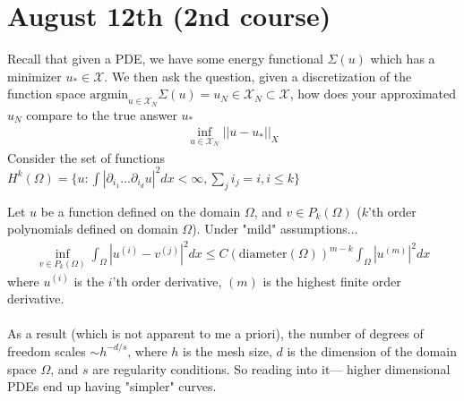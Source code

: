 \section{August 12th (2nd course)}
Recall that given a PDE, we have some energy functional $\Sigma(u)$ which has a minimizer $u_* \in \mathcal X$. We then ask the question, given a discretization of the function space $\text{argmin}_{u \in \mathcal X_N} \Sigma(u) = u_N \in \mathcal X_N \subset \mathcal X$, how does your approximated $u_N$ compare to the true answer $u_*$
\begin{align}
	\inf_{u \in \mathcal X_N}||u-u_*||_X
\end{align}
Consider the set of functions $H^k(\Omega) = \{u : \int |\partial_{i_1} ... \partial_{i_d} u|^2 d x < \infty, \sum_j i_j = i, i \leq k\}$

\begin{theorem}
	 Let $u$ be a function defined on the domain $\Omega$, and $v \in P_k(\Omega)$ ($k$'th order polynomials defined on domain $\Omega$). Under "mild" assumptions...
	\begin{align}
		\inf_{v \in P_k(\Omega)} \int_\Omega |u^{(i)} - v^{(j)}|^2 dx \leq C (\text{diameter}(\Omega))^{m-k} \int_\Omega |u^{(m)}|^2 dx
	\end{align}
	where $u^{(i)}$ is the $i$'th order derivative, $(m)$ is the highest finite order derivative.\\
	\\
	As a result (which is not apparent to me a priori), the number of degrees of freedom scales $\sim h^{-d/s}$, where $h$ is the mesh size, $d$ is the dimension of the domain space $\Omega$, and $s$ are regularity conditions. So reading into it--- higher dimensional PDEs end up having "simpler" curves.
\end{theorem}

